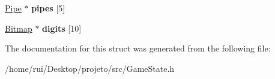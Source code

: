 \begin{DoxyCompactItemize}
\item 
\hyperlink{structPipe}{Pipe} $\ast$ {\bfseries pipes} \mbox{[}5\mbox{]}\hypertarget{structGameState_a2bb061e8297de507a9f475007679e478}{}\label{structGameState_a2bb061e8297de507a9f475007679e478}

\item 
\hyperlink{structBitmap}{Bitmap} $\ast$ {\bfseries digits} \mbox{[}10\mbox{]}\hypertarget{structGameState_af735b59e0ecf405eefdccc92b333ee68}{}\label{structGameState_af735b59e0ecf405eefdccc92b333ee68}

\end{DoxyCompactItemize}


The documentation for this struct was generated from the following file\+:\begin{DoxyCompactItemize}
\item 
/home/rui/\+Desktop/projeto/src/Game\+State.\+h\end{DoxyCompactItemize}
